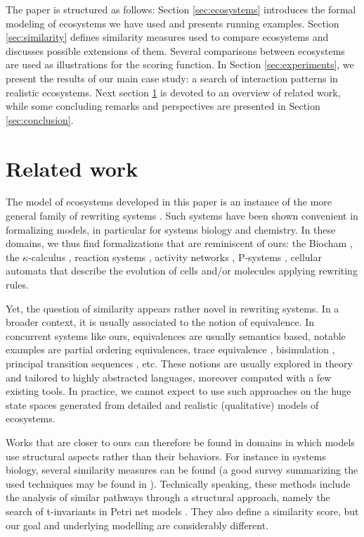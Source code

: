 \documentclass[a4paper,twoside]{article}
\begin{document}
The paper is structured as follows: Section \ref{sec:ecosystems} introduces the formal modeling of ecosystems we have used and presents running examples. Section \ref{sec:similarity} defines similarity measures used to compare ecosystems and discusses possible extensions of them. 
Several comparisons between ecosystems are used as illustrations for the scoring function.
In Section \ref{sec:experiments}, we present the results of our main case study: a search of interaction patterns in realistic ecosystems. 
Next section \ref{sec:related} is devoted to an overview of related work, while some concluding remarks and perspectives are presented in Section \ref{sec:conclusion}.  

\section{Related work}
\label{sec:related}

The model of ecosystems developed in this paper is an instance of the more general family of rewriting systems \cite{Terese03}. 
Such systems have been shown convenient in formalizing models, in particular for systems biology and chemistry. 
In these domains, we thus find formalizations that are reminiscent of ours: the Biocham \cite{Fages:2008:FCB:1786698.1786702}, the $\kappa$-calculus \cite{DBLP:journals/tcs/DanosL04}, reaction systems \cite{reactionsystems}, activity networks 
\cite{toxico2017}, P-systems
\cite{DBLP:journals/ijfcs/PaunPRS11}, cellular automata \cite{gaucherel2006,agnihotri15}
that describe the evolution of cells and/or molecules applying rewriting rules.


Yet, the question of similarity appears rather novel in rewriting systems. In a broader context, it is usually associated to the notion of equivalence. In concurrent systems like ours, equivalences are usually semantics based,  notable examples are partial ordering equivalences, trace equivalence \cite{vanglabbek89}, bisimulation \cite{Sangiorgi:2011:IBC:2103603}, principal transition sequences \cite{DBLP:conf/otm/WangHWWHS10}, etc.  
These notions are usually explored in theory and tailored to highly abstracted languages, moreover computed with a few existing tools. 
In practice, we cannot expect to use such approaches on the huge state spaces generated from detailed and realistic (qualitative) models of ecosystems.   

Works that are closer to ours can therefore be found in domains in which models use structural aspects rather than their behaviors. 
For instance in systems biology, several similarity measures can be found (a good survey summarizing the used techniques may be found in \cite{bbw090}).   
Technically speaking, these methods include the analysis of similar pathways through a structural approach, namely the search of t-invariants in Petri net models \cite{Baldan2013ComparingMP, DBLP:journals/topnoc/BaldanCGS13, Grafahrend-Belau2008}.
They also define a similarity score, but our goal and underlying modelling are considerably different.
\end{document}
